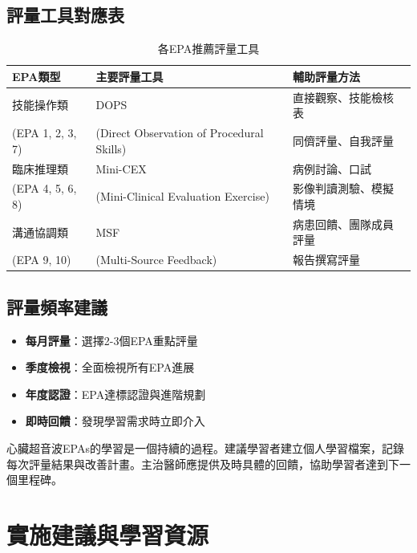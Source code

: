 \documentclass[12pt,a4paper]{article}
\newcommand{\note}[1]{
    \par
    \noindent
    \begin{tcolorbox}[
        colback=emergency_blue!5!white,
        colframe=emergency_blue,
        title=\textbf{重點提醒},
        fonttitle=\bfseries,
        boxrule=0.5pt,
        arc=3pt,
        left=6pt,
        right=6pt,
        top=6pt,
        bottom=6pt
    ]
    #1
    \end{tcolorbox}
}
\begin{document}
\subsection{評量工具對應表}
\begin{table}[h]
    \centering
    \caption{各EPA推薦評量工具}
    \begin{tabular}{p{4cm} p{4cm} p{6cm}}
        \toprule
        \textbf{EPA類型} & \textbf{主要評量工具} & \textbf{輔助評量方法} \\
        \midrule
        技能操作類 & DOPS & 直接觀察、技能檢核表 \\
        (EPA 1, 2, 3, 7) & (Direct Observation of Procedural Skills) & 同儕評量、自我評量 \\
        \midrule
        臨床推理類 & Mini-CEX & 病例討論、口試 \\
        (EPA 4, 5, 6, 8) & (Mini-Clinical Evaluation Exercise) & 影像判讀測驗、模擬情境 \\
        \midrule
        溝通協調類 & MSF & 病患回饋、團隊成員評量 \\
        (EPA 9, 10) & (Multi-Source Feedback) & 報告撰寫評量 \\
        \bottomrule
    \end{tabular}
\end{table}

\subsection{評量頻率建議}
\begin{itemize}[nosep]
    \item \textbf{每月評量}：選擇2-3個EPA重點評量
    \item \textbf{季度檢視}：全面檢視所有EPA進展
    \item \textbf{年度認證}：EPA達標認證與進階規劃
    \item \textbf{即時回饋}：發現學習需求時立即介入
\end{itemize}

\vspace{0.5cm}
\note{
心臟超音波EPAs的學習是一個持續的過程。建議學習者建立個人學習檔案，記錄每次評量結果與改善計畫。主治醫師應提供及時具體的回饋，協助學習者達到下一個里程碑。
}

\section{實施建議與學習資源}
\end{document}
